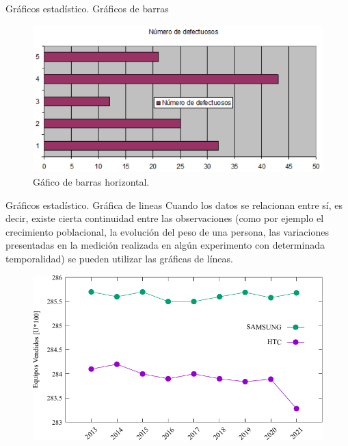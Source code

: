 \documentclass[11pt]{beamer}
\begin{document}
      \begin{frame}{Gráficos estadístico. Gráficos de barras}
        \begin{figure}
          \centering
          \includegraphics[width=0.7\linewidth]{images/graficos_barra3}
          \caption{Gáfico de barras horizontal.}
          \label{fig:graficosbarra3}
        \end{figure}
      \end{frame}

      \begin{frame}{Gráficos estadístico. Gráfica de lineas}
          Cuando los datos se relacionan entre sí, es decir, existe cierta continuidad entre las observaciones (como por ejemplo el crecimiento poblacional, la evolución del peso de una persona, las variaciones presentadas en la medición realizada en algún experimento con determinada temporalidad) se pueden utilizar las gráficas de líneas.
          \begin{figure}
              \centering
              \includegraphics[width=0.6\linewidth]{images/Lecture_1h}
              \label{fig:lecture1hh}
          \end{figure}

      \end{frame}
\end{document}
